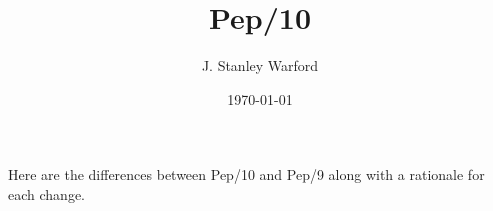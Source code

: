 \documentclass[10pt,fleqn]{book}
\begin{document}
\frontmatter

	\title{\Huge Pep/10}
	\author{J. Stanley Warford}
	\date{\today}
	\maketitle


\mainmatter
	\pagestyle{fancy}
	\fancyhf{}
	\renewcommand{\headrulewidth}{1pt}
	\renewcommand{\footrulewidth}{0pt}
	\renewcommand{\chaptermark}[1]{\markboth{\sffamily\chaptername{} \thechapter\quad \large\rmfamily\slshape#1}{}}
	\renewcommand{\sectionmark}[1]{\markright{#1}}
	\renewcommand{\headrule}{{\color{blue} \hrule width\headwidth height\headrulewidth \vskip-\headrulewidth}}	

\setcounter{page}{1}
\noindent Here are the differences between Pep/10 and Pep/9 along with a rationale for each change.
\end{document}

